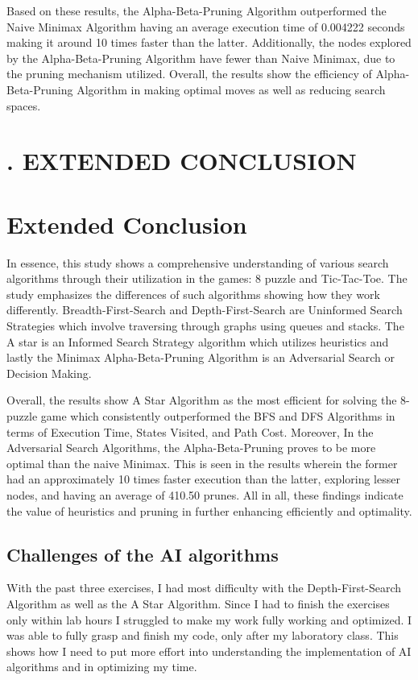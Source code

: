 \documentclass[journal]{./IEEE/IEEEtran}
\begin{document}
Based on these results, the Alpha-Beta-Pruning Algorithm outperformed the Naive Minimax 
Algorithm having an average execution time of 0.004222 seconds making it around 10 times faster 
than the latter. Additionally, the nodes explored by the Alpha-Beta-Pruning Algorithm have fewer 
than Naive Minimax, due to the pruning mechanism utilized. Overall, the results show the efficiency 
of Alpha-Beta-Pruning Algorithm in making optimal moves as well as reducing search spaces.


\setcounter{section}{3}
\renewcommand{\thesection}{}

\section*{\normalsize \thesection. EXTENDED CONCLUSION}
\addcontentsline{toc}{section}{\thesection. Extended Conclusion}

\section{Extended Conclusion}
In essence, this study shows a comprehensive understanding of various search algorithms 
through their utilization in the games: 8 puzzle and Tic-Tac-Toe. The study emphasizes the 
differences of such algorithms showing how they work differently. Breadth-First-Search and 
Depth-First-Search are Uninformed Search Strategies which involve traversing through graphs 
using queues and stacks. The A star is an Informed Search Strategy algorithm which utilizes 
heuristics and lastly the Minimax Alpha-Beta-Pruning Algorithm is an Adversarial Search or Decision Making. 

Overall, the results show A Star Algorithm as the most efficient for solving the 8-puzzle 
game which consistently outperformed the BFS and DFS Algorithms in terms of Execution Time, 
States Visited, and Path Cost. Moreover, In the Adversarial Search Algorithms, the Alpha-Beta-Pruning 
proves to be more optimal than the naive Minimax. This is seen in the results wherein the former had an 
approximately 10 times faster execution than the latter, exploring lesser nodes, and having an average of 
410.50 prunes. All in all, these findings indicate the value of heuristics and pruning in further enhancing 
efficiently and optimality.

\subsection{Challenges of the AI algorithms}
With the past three exercises, I had most difficulty with the Depth-First-Search Algorithm as well as the 
A Star Algorithm. Since I had to finish the exercises only within lab hours I struggled to make my work 
fully working and optimized. I was able to fully grasp and finish my code, only after my laboratory class. 
This shows how I need to put more effort into understanding the implementation of AI algorithms and in optimizing my time.
\end{document}
